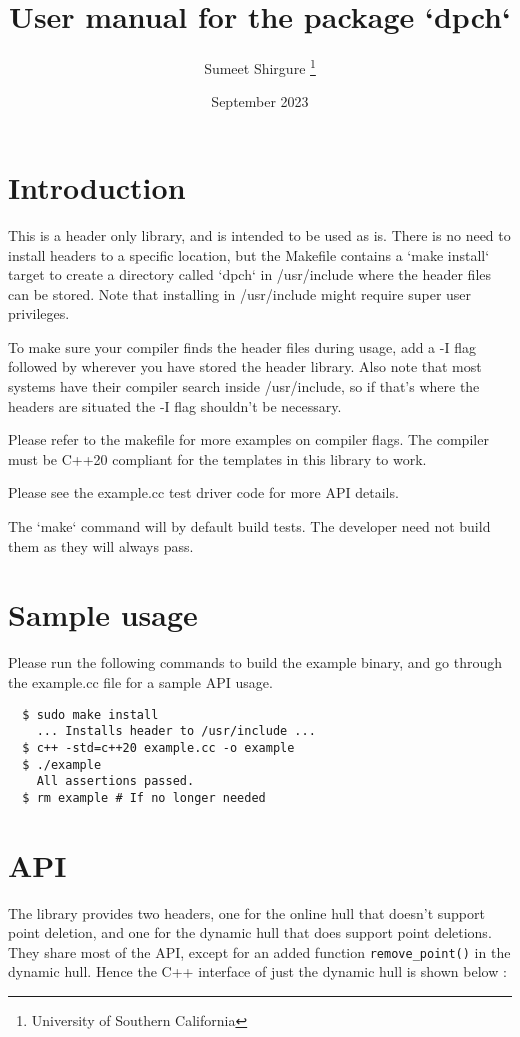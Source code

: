 \documentclass[10pt, letterpaper]{article}
\title{User manual for the package `dpch`}
\author{Sumeet Shirgure \thanks{University of Southern California}}
\date{September 2023}
\begin{document}
\maketitle

\section{Introduction}
This is a header only library, and is intended to be used as is.
There is no need to install headers to a specific location, but the Makefile contains a `make install` target to create a directory
called `dpch` in /usr/include where the header files can be stored.
Note that installing in /usr/include might require super user privileges.

To make sure your compiler finds the header files during usage, add a -I flag
followed by wherever you have stored the header library.
Also note that most systems have their compiler search inside /usr/include,
so if that's where the headers are situated the -I flag shouldn't be necessary.

Please refer to the makefile for more examples on compiler flags.
The compiler must be C++20 compliant for the templates in this library to work.

Please see the example.cc test driver code for more API details.

The `make` command will by default build tests.
The developer need not build them as they will always pass.

\section{Sample usage}

Please run the following commands to build the example binary,
and go through the example.cc file for a sample API usage.
\begin{verbatim}
  $ sudo make install
    ... Installs header to /usr/include ...
  $ c++ -std=c++20 example.cc -o example
  $ ./example
    All assertions passed.
  $ rm example # If no longer needed
\end{verbatim}

\section{API}
The library provides two headers, one for the online hull that doesn't support
point deletion, and one for the dynamic hull that does support point deletions.
They share most of the API, except for an added function \verb|remove_point()|
in the dynamic hull.
Hence the C++ interface of just the dynamic hull is shown below :
\end{document}
